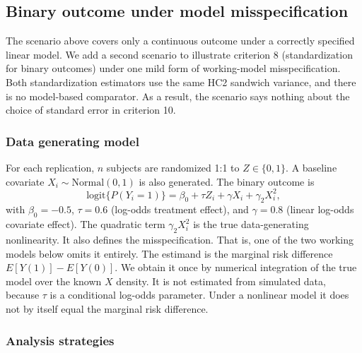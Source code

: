 \documentclass[
  11pt,
]{article}
\begin{document}
\subsection{Binary outcome under model misspecification}\label{binary-outcome-under-model-misspecification}

The scenario above covers only a continuous outcome
under a correctly specified linear model. We add a
second scenario to illustrate criterion 8
(standardization for binary outcomes) under one mild
form of working-model misspecification. Both
standardization estimators use the same HC2 sandwich
variance, and there is no model-based comparator. As a
result, the scenario says nothing about the choice of
standard error in criterion 10.

\subsubsection{Data generating model}\label{data-generating-model-1}

For each replication, \(n\) subjects are randomized 1:1
to \(Z \in \{0, 1\}\). A baseline covariate
\(X_i \sim \text{Normal}(0, 1)\) is also generated. The
binary outcome is
\[\text{logit}\{P(Y_i = 1)\} = \beta_0 + \tau Z_i + \gamma X_i
+ \gamma_2 X_i^2,\]
with \(\beta_0 = -0.5\), \(\tau = 0.6\) (log-odds treatment
effect), and \(\gamma = 0.8\) (linear log-odds covariate
effect). The quadratic term \(\gamma_2 X_i^2\) is the true
data-generating nonlinearity. It also defines the
misspecification. That is, one of the two working
models below omits it entirely. The estimand is the
marginal risk difference \(E[Y(1)] - E[Y(0)]\). We obtain
it once by numerical integration of the true model over
the known \(X\) density. It is not estimated from
simulated data, because \(\tau\) is a conditional
log-odds parameter. Under a nonlinear model it does
not by itself equal the marginal risk difference.

\subsubsection{Analysis strategies}\label{analysis-strategies-1}
\end{document}
